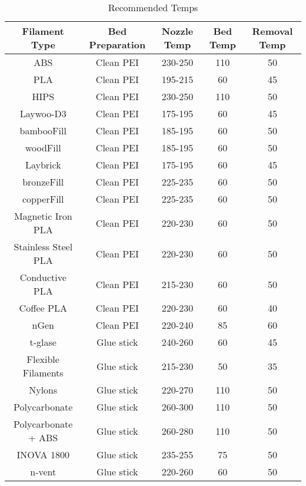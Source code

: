 \begin{table}[H]
	\begin{center}
 		\hspace*{-1.5cm}\begin{tabular}{||c c c c c||} 
 		\hline
 		Filament Type & Bed Preparation & Nozzle Temp & Bed Temp & Removal Temp \\ [0.5ex] 
 		\hline\hline
 		ABS & Clean PEI & 230-250 & 110 & 50 \\ 
 		\hline
 		PLA & Clean PEI & 195-215 & 60 & 45\\
 		\hline
 		HIPS & Clean PEI & 230-250 & 110 & 50 \\
 		\hline
 		Laywoo-D3 & Clean PEI & 175-195 & 60 & 45 \\
 		\hline
		bambooFill & Clean PEI & 185-195 & 60 & 50 \\ 
 		\hline
		woodFill & Clean PEI & 185-195 & 60 & 50 \\
 		\hline
 		Laybrick & Clean PEI & 175-195 & 60 & 45 \\
		\hline
		bronzeFill & Clean PEI & 225-235 & 60 & 50 \\
		\hline
		copperFill & Clean PEI & 225-235 & 60 & 50 \\
 		\hline 
 		Magnetic Iron PLA & Clean PEI & 220-230 & 60 & 50 \\
 		\hline
 		Stainless Steel PLA & Clean PEI & 220-230 & 60 & 50 \\
 		\hline
 		Conductive PLA & Clean PEI & 215-230 & 60 & 50 \\
		\hline
		Coffee PLA & Clean PEI & 220-230 & 60 & 40 \\
 		\hline
 		nGen & Clean PEI & 220-240 & 85 & 60 \\
 		\hline
 		t-glase & Glue stick & 240-260 & 60 & 45 \\
 		\hline
 		Flexible Filaments & Glue stick & 215-230 & 50 & 35 \\  
 		\hline
 		Nylons & Glue stick & 220-270 & 110 & 50 \\
 		\hline
 		Polycarbonate & Glue stick & 260-300 & 110 & 50 \\ 
 		\hline
 		Polycarbonate + ABS & Glue stick & 260-280 & 110 & 50 \\
 		\hline
 		INOVA 1800 & Glue stick & 235-255 & 75 & 50 \\
 		\hline
 		n-vent & Glue stick & 220-260 & 60 & 50 \\ [1ex]
 		\hline
 
		\end{tabular}
		\caption{Recommended Temps}\label{tab:a}
	\end{center}
\end{table}


